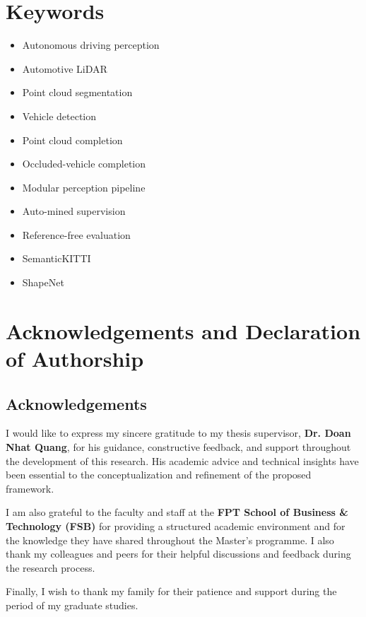\documentclass[a4paper,12pt]{report}
\begin{document}
\chapter*{Keywords}
\begin{itemize}\setlength{\itemsep}{2pt}
  \item Autonomous driving perception
  \item Automotive LiDAR
  \item Point cloud segmentation
  \item Vehicle detection
  \item Point cloud completion
  \item Occluded-vehicle completion
  \item Modular perception pipeline
  \item Auto-mined supervision
  \item Reference-free evaluation
  \item SemanticKITTI
  \item ShapeNet
\end{itemize}
\clearpage


\chapter*{Acknowledgements and Declaration of Authorship}

\section*{Acknowledgements}
I would like to express my sincere gratitude to my thesis supervisor, \textbf{Dr. Doan Nhat Quang}, for his guidance, constructive feedback, and support throughout the development of this research. His academic advice and technical insights have been essential to the conceptualization and refinement of the proposed framework.

I am also grateful to the faculty and staff at the \textbf{FPT School of Business \& Technology (FSB)} for providing a structured academic environment and for the knowledge they have shared throughout the Master's programme. I also thank my colleagues and peers for their helpful discussions and feedback during the research process.

Finally, I wish to thank my family for their patience and support during the period of my graduate studies.
\end{document}

